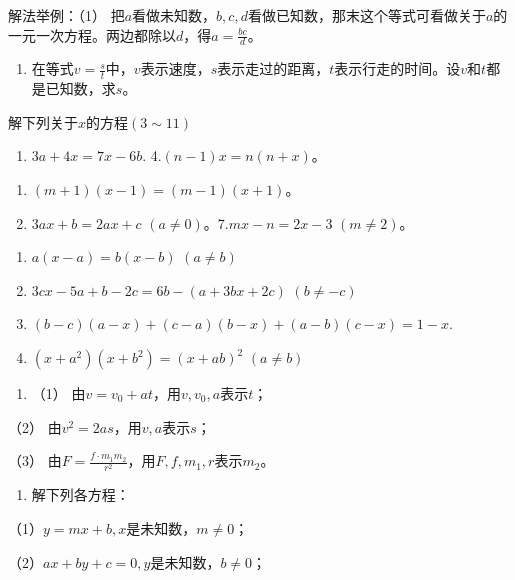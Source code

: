 解法举例：（1）
把\(a\)看做未知数，\(b, c, d\)看做已知数，那末这个等式可看做关于\(a\)的一元一次方程。两边都除以\(d\)，得\(a = \frac{bc}{d}\)。

\begin{enumerate}[start=2]
\item
  在等式\(v = \frac{s}{t}\)中，\(v\)表示速度，\(s\)表示走过的距离，\(t\)表示行走的时间。设\(v\)和\(t\)都是已知数，求\(s\)。
\end{enumerate}

解下列关于\(x\)的方程\((3\sim 11)\)

\begin{enumerate}[start=3]
\item
  \(3a + 4x = 7x - 6b.\) 4.\((n - 1)x = n(n + x)\)。
\end{enumerate}

\begin{enumerate}[start=5]
\item
  \((m + 1)(x - 1) = (m - 1)(x + 1)\)。
\item
  \(3ax + b = 2ax + c\) \((a \neq 0)\)。7.\(mx - n = 2x - 3\) \((m \neq 2)\)。
\end{enumerate}

\begin{enumerate}[start=8]
\item
  \(a(x - a) = b(x - b)\) \((a\neq b)\)
\item
  \(3cx - 5a + b - 2c = 6b - (a + 3bx + 2c)\) \((b\neq -c)\)
\item
  \((b - c)(a - x) + (c - a)(b - x) + (a - b)(c - x) = 1 - x.\)
\item
  \((x + a^2)(x + b^2) = (x + ab)^2\) \((a\neq b)\)
\end{enumerate}

\begin{enumerate}[start=12]
\item
  （1） 由\(v = v_0 + at\)，用\(v, v_0, a\)表示\(t\)；
\end{enumerate}

（2） 由\(v^2 = 2as\)，用\(v, a\)表示\(s\)；

（3）
由\(F = \frac{f \cdot m_1 m_2}{r^2}\)，用\(F, f, m_1, r\)表示\(m_2\)。

\begin{enumerate}[start=13]
\item
  解下列各方程：
\end{enumerate}

（1）\(y = mx + b, x\)是未知数，\(m \neq 0\)；

（2）\(ax + by + c = 0, y\)是未知数，\(b \neq 0\)；

